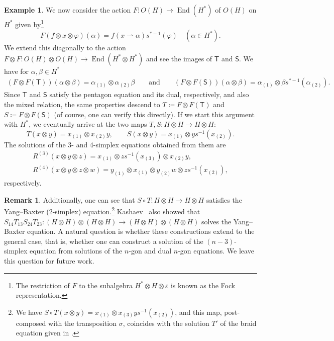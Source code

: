 \documentclass[pdftex]{sigma}
\numberwithin{equation}{section}
\theoremstyle{definition}
\newtheorem{Example}[Theorem]{Example}
\newtheorem{Remark}[Theorem]{Remark}
\begin{document}
\begin{Example}
 We now consider the action $F\colon O(H)\to\operatorname{End}(H^*)$ of $O(H)$ on $H^*$ given by\footnote{The restriction of $F$ to the subalgebra $H^*\otimes H\otimes \varepsilon$ is known as the Fock representation.}
 \begin{equation*}
 F(f\otimes x\otimes\varphi)(\alpha)=f(x\rightharpoonup\alpha)s^{*-1}(\varphi)\quad (\alpha\in H^*).
 \end{equation*}
 We extend this diagonally to the action $F\otimes F\colon O(H)\otimes O(H)\to\operatorname{End}(H^*\otimes H^*)$ and see the images of $\mathsf{T}$ and $\mathsf{S}$.
 We have for $\alpha,\beta\in H^*$
 \begin{align*}
 (F\otimes F(\mathsf{T}))(\alpha\otimes\beta) = \alpha_{(1)}\otimes\alpha_{(2)}\beta \qquad\text{and}\qquad (F\otimes F(\mathsf{S}))(\alpha\otimes\beta) = \alpha_{(1)}\otimes\beta s^{*-1}(\alpha_{(2)}).
 \end{align*}
 Since $\mathsf{T}$ and $\mathsf{S}$ satisfy the pentagon equation and its dual, respectively, and also the mixed relation, the same properties descend to $T\coloneqq F\otimes F(\mathsf{T})$ and $S\coloneqq F\otimes F(\mathsf{S})$ (of course, one can verify this directly). If we start this argument with $H^*$, we eventually arrive at the two maps $T,S\colon H\otimes H\to H\otimes H$:
 \begin{equation*}
 T(x\otimes y) = x_{(1)}\otimes x_{(2)}y,\qquad S(x\otimes y) = x_{(1)}\otimes ys^{-1}(x_{(2)}).
 \end{equation*}
 The solutions of the 3- and 4-simplex equations obtained from them are
 \begin{gather*}
 R^{(3)}(x\otimes y\otimes z) = x_{(1)}\otimes zs^{-1}(x_{(3)})\otimes x_{(2)}y,\\ R^{(4)}(x\otimes y\otimes z\otimes w) = y_{(1)}\otimes x_{(1)}\otimes y_{(2)}w\otimes zs^{-1}(x_{(2)}),
 \end{gather*}
 respectively.

 \begin{Remark}
 Additionally, one can see that $S\circ T\colon H\otimes H\to H\otimes H$ satisfies the Yang--Baxter (2-simplex) equation.\footnote{We have $S\circ T(x\otimes y)=x_{(1)}\otimes x_{(3)}ys^{-1}(x_{(2)})$, and this map, post-composed with the transposition $\sigma$, coincides with the solution $T'$ of the braid equation given in \cite{woronowicz1991solutions}.} Kashaev~\cite{kashaev1995heisenberg} also showed that $S_{14}T_{13}S_{24}T_{23}\colon(H\otimes H)\otimes(H\otimes H)\to (H\otimes H)\otimes(H\otimes H)$ solves the Yang--Baxter equation. A natural question is whether these constructions extend to the general case, that is, whether one can construct a solution of the $(n-3)$-simplex equation from solutions of the $n$-gon and dual $n$-gon equations. We leave this question for future work.
 \end{Remark}
\end{Example}
\end{document}
